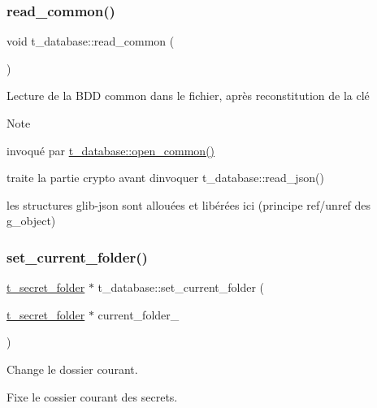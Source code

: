 \subsubsection{\texorpdfstring{read\+\_\+common()}{read\_common()}}
{\footnotesize\ttfamily void t\+\_\+database\+::read\+\_\+common (\begin{DoxyParamCaption}{ }\end{DoxyParamCaption})}



Lecture de la B\+DD common dans le fichier, après reconstitution de la clé 

\begin{DoxyNote}{Note}

\begin{DoxyItemize}
\item invoqué par \hyperlink{classt__database_a22b32d446f8e07101c81354517502467}{t\+\_\+database\+::open\+\_\+common()}
\item traite la partie crypto avant d\textquotesingle{}invoquer t\+\_\+database\+::read\+\_\+json()
\item les structures glib-\/json sont allouées et libérées ici (principe ref/unref des g\+\_\+object) 
\end{DoxyItemize}
\end{DoxyNote}
\mbox{\label{classt__database_a754f4bf1a2ca3f3676d31ee818302353}} 
\subsubsection{\texorpdfstring{set\+\_\+current\+\_\+folder()}{set\_current\_folder()}}
{\footnotesize\ttfamily \hyperlink{classt__secret__folder}{t\+\_\+secret\+\_\+folder} $\ast$ t\+\_\+database\+::set\+\_\+current\+\_\+folder (\begin{DoxyParamCaption}\item[{\hyperlink{classt__secret__folder}{t\+\_\+secret\+\_\+folder} $\ast$}]{current\+\_\+folder\+\_\+ }\end{DoxyParamCaption})}



Change le dossier courant. 

Fixe le cossier courant des secrets. \mbox{\label{classt__database_a3be05e92644b436dda5f8d982956743a}} 
